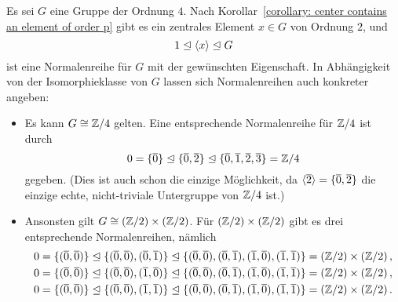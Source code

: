 Es sei $G$ eine Gruppe der Ordnung $4$.
Nach Korollar~\ref{corollary: center contains an element of order p} gibt es ein zentrales Element $x \in G$ von Ordnung $2$, und
\[
              1
  \trianglelefteq  \langle x\rangle
  \trianglelefteq  G
\]
ist eine Normalenreihe für $G$ mit der gewünschten Eigenschaft.
In Abhängigkeit von der Isomorphieklasse von $G$ lassen sich Normalenreihen auch konkreter angeben:
\begin{itemize}
  \item
    Es kann $G \cong \mathbb{Z}/4$ gelten.
    Eine entsprechende Normalenreihe für $\mathbb{Z}/4$ ist durch
    \[
                  0
      =           \{ \overline{0} \}
      \trianglelefteq  \{ \overline{0}, \overline{2} \}
      \trianglelefteq  \{ \overline{0}, \overline{1}, \overline{2}, \overline{3} \}
      =           \mathbb{Z}/4
    \]
    gegeben.
    (Dies ist auch schon die einzige Möglichkeit, da $\langle \overline{2} \rangle = \{ \overline{0}, \overline{2} \}$ die einzige echte, nicht-triviale Untergruppe von $\mathbb{Z}/4$ ist.)
  \item
    Ansonsten gilt $G \cong (\mathbb{Z}/2) \times (\mathbb{Z}/2)$.
    Für $(\mathbb{Z}/2) \times (\mathbb{Z}/2)$ gibt es drei entsprechende Normalenreihen, nämlich
    \begin{gather*}
                  0
      =           \{ (\overline{0},\overline{0}) \}
      \trianglelefteq  \{ (\overline{0},\overline{0}), (\overline{0},\overline{1}) \}
      \trianglelefteq  \{ (\overline{0},\overline{0}), (\overline{0},\overline{1}), (\overline{1},\overline{0}), (\overline{1},\overline{1}) \}
      =           (\mathbb{Z}/2) \times (\mathbb{Z}/2)\,,
      \\
                  0
      =           \{ (\overline{0},\overline{0}) \}
      \trianglelefteq  \{ (\overline{0},\overline{0}), (\overline{1},\overline{0}) \}
      \trianglelefteq  \{ (\overline{0},\overline{0}), (\overline{0},\overline{1}), (\overline{1},\overline{0}), (\overline{1},\overline{1}) \}
      =           (\mathbb{Z}/2) \times (\mathbb{Z}/2)\,,
      \\
                  0
      =           \{ (\overline{0},\overline{0}) \}
      \trianglelefteq  \{ (\overline{0},\overline{0}), (\overline{1},\overline{1}) \}
      \trianglelefteq  \{ (\overline{0},\overline{0}), (\overline{0},\overline{1}), (\overline{1},\overline{0}), (\overline{1},\overline{1}) \}
      =           (\mathbb{Z}/2) \times (\mathbb{Z}/2)\,.
    \end{gather*}
\end{itemize}





\subsection{}

